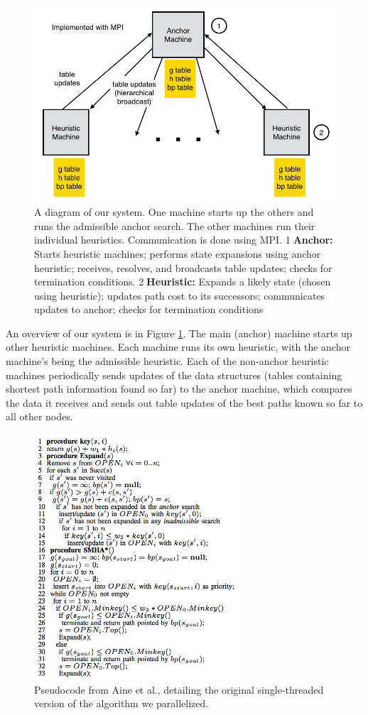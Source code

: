 \documentclass[11pt]{article}
\begin{document}
\begin{figure}
\centering \includegraphics[width=5.0in]{system-diagram}
\caption{A diagram of our system. One machine starts up the others and runs the admissible anchor search. The other machines run their individual heuristics. Communication is done using MPI. 
\textcircled{1}\textbf{Anchor:} Starts heuristic machines; performs state expansions using anchor heuristic; receives, resolves, and broadcasts table updates; checks for termination conditions. \textcircled{2}\textbf{Heuristic:} Expands a likely state (chosen using heuristic); updates path cost to its successors; communicates updates to anchor; checks for termination conditions}
\label{fig:sysdiag}
\end{figure}

An overview of our system is in Figure \ref{fig:sysdiag}. The main (anchor) machine starts up other heuristic machines. Each machine runs its own heuristic, with the anchor machine's being the admissible heuristic. Each of the non-anchor heuristic machines periodically sends updates of the data structures (tables containing shortest path information found so far) to the anchor machine, which compares the data it receives and sends out table updates of the best paths known so far to all other nodes.

\begin{figure}
\centering \includegraphics[width=3in]{pseudocode}
\caption{Pseudocode from Aine et al., detailing the original single-threaded version of the algorithm we parallelized.}
\label{fig:pseudocode}
\end{figure}
\end{document}
